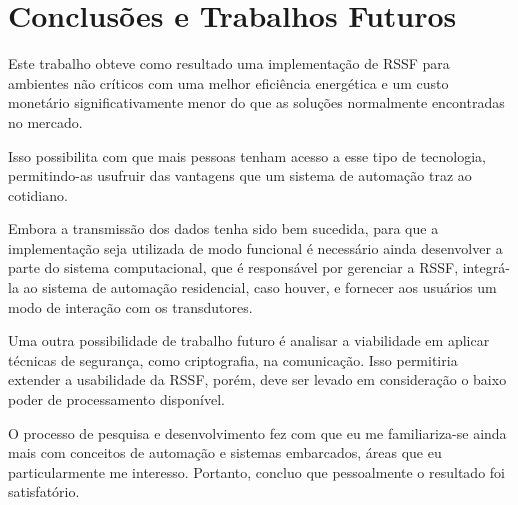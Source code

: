 \chapter{Conclusões e Trabalhos Futuros}
\label{cap:conclusao}
Este trabalho obteve como resultado uma implementação de RSSF para ambientes não críticos com uma melhor
eficiência energética e um custo monetário significativamente menor do que as soluções normalmente encontradas
no mercado.

Isso possibilita com que mais pessoas tenham acesso a esse tipo de tecnologia, permitindo-as usufruir das
vantagens que um sistema de automação traz ao cotidiano.

Embora a transmissão dos dados tenha sido bem sucedida, para que a implementação seja utilizada de modo
funcional é necessário ainda desenvolver a parte do sistema computacional, que é responsável por gerenciar a
RSSF, integrá-la ao sistema de automação residencial, caso houver, e fornecer aos usuários um modo de
interação com os transdutores.

Uma outra possibilidade de trabalho futuro é analisar a viabilidade em aplicar técnicas de segurança, como
criptografia, na comunicação. Isso permitiria extender a usabilidade da RSSF, porém, deve ser levado em
consideração o baixo poder de processamento disponível.

O processo de pesquisa e desenvolvimento fez com que eu me familiariza-se ainda mais com conceitos de
automação e sistemas embarcados, áreas que eu particularmente me interesso. Portanto, concluo que pessoalmente
o resultado foi satisfatório.
